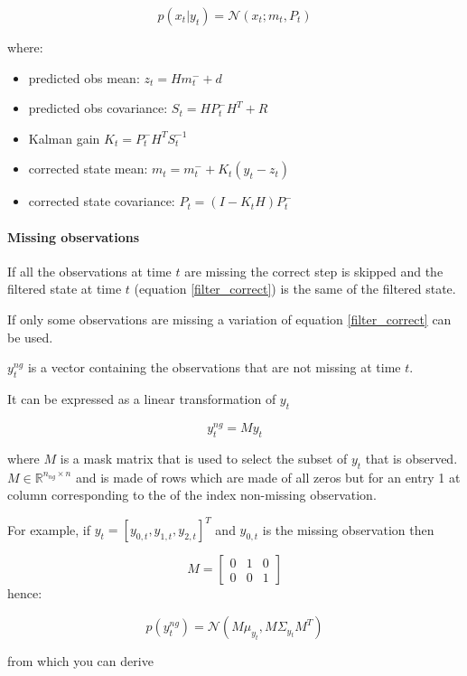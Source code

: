 \documentclass{article}
\begin{document}
\begin{equation}\label{filter_update}
 p(x_t|y_t) = \mathcal{N}(x_t; m_t, P_t)   
\end{equation}
    
where:

\begin{itemize}
    \item predicted obs mean: $z_t = Hm_t^- + d$   
    \item predicted obs covariance: $S_t = HP_t^-H^T + R$
    \item Kalman gain $K_t = P_t^-H^TS_t^{-1}$ 
    \item corrected state mean: $m_t = m_t^- + K_t(y_t - z_t)$ 
    \item corrected state covariance: $P_t = (I-K_tH)P_t^-$ 
\end{itemize}

\paragraph{Missing observations}
If all the observations at time $t$ are missing the correct step is skipped and the filtered state at time $t$ (equation \ref{filter_correct}) is the same of the filtered state.

If only some observations are missing a variation of equation \ref{filter_correct} can be used.

$y^{ng}_t$ is a vector containing the observations that are not missing at time $t$. 

It can be expressed as a linear transformation of $y_t$

$$ y^{ng}_t = My_t$$

where $M$ is a mask matrix that is used to select the subset of $y_t$ that is observed. $M \in \mathbb{R}^{n_{ng} \times n}$ and is made of rows which are made of all zeros but for an entry 1 at column corresponding to the of the index non-missing observation.

For example, if $y_t = [y_{0,t}, y_{1,t}, y_{2,t}]^T$ and $y_{0,t}$ is the missing observation then

$$ M = \left[\begin{array}{ccc}
    0 & 1 & 0 \\
    0 & 0 & 1
\end{array}\right]$$
hence:

$$ p(y^{ng}_t) = \mathcal{N}(M\mu_{y_t},  M\Sigma_{y_t}M^T)$$

from which you can derive
\end{document}
